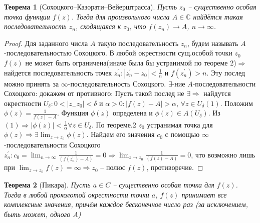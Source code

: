 \documentclass{article}
\newtheorem{theorem}{Теорема}[]
\begin{document}
\begin{theorem}[Сохоцкого–Казорати–Вейерштрасса]
Пусть $z_0$ – существенно особая точка функции $f(z)$. Тогда
для произвольного числа $A \in \mathbb{C}$ найдётся такая последовательность ${z_n}$, сходящаяся к $z_0$, что $f(z_n)\rightarrow A$, $n \rightarrow \infty$.
\end{theorem}
\begin{proof}
    Для заданного числа $A$ такую последовательность $z_n$, будем называть $A$-последовательностью Сохоцкого. В любой окрестности сущ.особой точки $z_0$ $f(z)$ не может быть ограничена(иначе была бы устранимой по теореме 2)$\Longrightarrow$ найдется последовательность точек $z_n^{'}: |z_n^{'}-z_0|<\frac{1}{n} \text{ и } f(z_n^{'}) > n.$ Эту послед можно принять за $\infty$-последовательность Сохоцкого. $\exists$-ние $A$-последовательности Сохоцкого: докажем от противного: Пусть такой послед не $\exists \Longrightarrow$ найдутся окрестности $U_\delta: 0<|z_-z_0|<\delta$ и $\alpha>0: |f(z)-A|>\alpha$, $\forall z \in U_\delta(1)$. Положим $\phi(z)=\frac{1}{f(z)-A}$. Функция $\phi(z)$ определена и $\phi(z) \in A(U_\delta)$. Из $(1)\Longrightarrow |\phi(z)|<\frac{1}{\alpha} \forall z \in U_\delta$. По теореме.2 $z_0$ устранимая точка для $\phi(z)\Longrightarrow \exists \displaystyle\lim_{z \rightarrow z_0}\phi(z)$. Найдем его значения $c_0$ с помощью $\infty$-последовательности Сохоцкого $z_n^{'}: c_0 = \displaystyle \lim_{n \rightarrow \infty} \frac{1}{(f(z_n^{'})-A)}=0 \Longrightarrow \displaystyle \lim_{z \rightarrow z_0} \frac{1}{(f(z)-A)}=0$, что возможно лишь при $\displaystyle\lim_{z\rightarrow z_0}f(z)=\infty \Longrightarrow z_0$ -- полюс $f(z)$, противоречие. 
\end{proof}

\begin{theorem}[Пикара]
Пусть $a \in C$ – существенно особая точка для $f(z)$. Тогда в любой проколотой окрестности
точки $a$, $f(z)$ принимает все комплексные значения, причём каждое бесконечное число раз
(за исключением, быть может, одного $A$)
\end{theorem}
\end{document}

